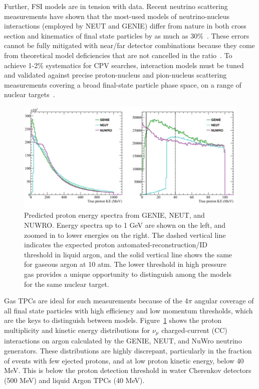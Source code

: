 Further, FSI models are in tension with data.  
Recent neutrino scattering measurements have shown that the most-used models of neutrino-nucleus interactions (employed by NEUT and GENIE) differ from nature in both cross section and kinematics of final state particles by as much as 30\%~\cite{Wascko:2009cn,Wascko:2011hy}. 
These errors cannot be fully mitigated with near/far detector combinations because they come from theoretical model deficiencies that are not cancelled in the ratio~\cite{Coloma:2013rqa}. 
To achieve 1-2\% systematics for CPV searches, interaction models must be tuned and validated against precise proton-nucleus and pion-nucleus scattering measurements covering a broad final-state particle phase space, on a range of nuclear targets~\cite{Cao:2014zra}.

\begin{figure}%
    \centering
    \includegraphics[width=12cm]{files/Figures/protons_from_argon.jpeg}%
    \caption{Predicted proton energy spectra from GENIE, NEUT, and NUWRO. Energy spectra up to 1 GeV are shown on the left, and zoomed in to lower energies on the right. The dashed vertical line indicates the expected proton automated-reconstruction/ID threshold in liquid argon, and the solid vertical line shows the same for gaseous argon at 10 atm. The lower threshold in high pressure gas provides a unique opportunity to distinguish among the models for the same nuclear target.}
    \label{fig:protonsfromargon}%
\end{figure}
Gas TPCs are ideal for such measurements because of the 4$\pi$ angular coverage of all final state particles with high efficiency and low momentum thresholds, which are the keys to distinguish between models.  
Figure~\ref{fig:protonsfromargon} shows the proton multiplicity and kinetic energy distributions for $\nu_{\mu}$ charged-current (CC) interactions on argon calculated by the GENIE, NEUT, and NuWro neutrino generators.  
These distributions are highly discrepant, particularly in the fraction of events with few ejected protons, and at low proton kinetic energy, below 40 MeV. 
This is below the proton detection threshold in water Cherenkov detectors (500 MeV) and liquid Argon TPCs (40 MeV). 

